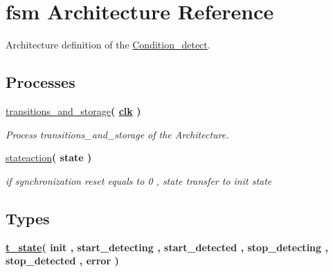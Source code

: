 \hypertarget{class_condition__detect_1_1fsm}{}\section{fsm Architecture Reference}
\label{class_condition__detect_1_1fsm}


Architecture definition of the \hyperlink{class_condition__detect}{Condition\+\_\+detect}.  


\subsection*{Processes}
 \begin{DoxyCompactItemize}
\item 
\hyperlink{class_condition__detect_1_1fsm_aca869937c40a3cb0b3e8467b28f4c42b}{transitions\+\_\+and\+\_\+storage}{\bfseries  ( {\bfseries {\bfseries \hyperlink{class_condition__detect_a6231b307b7958b6060563aa2a93d345a}{clk}} \textcolor{vhdlchar}{ }} )}
\begin{DoxyCompactList}\small\item\em Process transitions\+\_\+and\+\_\+storage of the Architecture. \end{DoxyCompactList}\item 
\hyperlink{class_condition__detect_1_1fsm_ab52d69072c9e0a01dc1a2642b28297ab}{stateaction}{\bfseries  ( {\bfseries \textcolor{vhdlchar}{state}\textcolor{vhdlchar}{ }} )}\hypertarget{class_condition__detect_1_1fsm_ab52d69072c9e0a01dc1a2642b28297ab}{}\label{class_condition__detect_1_1fsm_ab52d69072c9e0a01dc1a2642b28297ab}

\begin{DoxyCompactList}\small\item\em if synchronization reset equals to 0 , state transfer to init state \end{DoxyCompactList}\end{DoxyCompactItemize}
\subsection*{Types}
 \begin{DoxyCompactItemize}
\item 
{\bfseries \hyperlink{class_condition__detect_1_1fsm_af1aa411452cee18437e460b9d30ed364}{t\+\_\+state}{\bfseries \textcolor{vhdlchar}{(}\textcolor{vhdlchar}{ }\textcolor{vhdlchar}{init}\textcolor{vhdlchar}{ }\textcolor{vhdlchar}{,}\textcolor{vhdlchar}{ }\textcolor{vhdlchar}{start\+\_\+detecting}\textcolor{vhdlchar}{ }\textcolor{vhdlchar}{,}\textcolor{vhdlchar}{ }\textcolor{vhdlchar}{start\+\_\+detected}\textcolor{vhdlchar}{ }\textcolor{vhdlchar}{,}\textcolor{vhdlchar}{ }\textcolor{vhdlchar}{stop\+\_\+detecting}\textcolor{vhdlchar}{ }\textcolor{vhdlchar}{,}\textcolor{vhdlchar}{ }\textcolor{vhdlchar}{stop\+\_\+detected}\textcolor{vhdlchar}{ }\textcolor{vhdlchar}{,}\textcolor{vhdlchar}{ }\textcolor{vhdlchar}{error}\textcolor{vhdlchar}{ }\textcolor{vhdlchar}{)}\textcolor{vhdlchar}{ }}} 
\end{DoxyCompactItemize}
